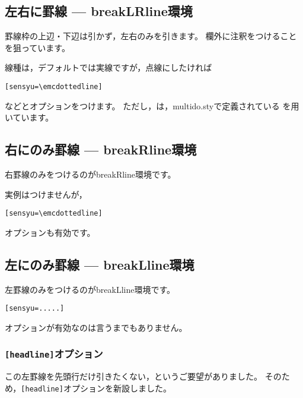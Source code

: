 \documentclass[a4j,fleqn]{jarticle}
\begin{document}
\subsection{左右に罫線 --- \textsf{breakLRline}環境}
罫線枠の上辺・下辺は引かず，左右のみを引きます。
欄外に注釈をつけることを狙っています。\bigskip



線種は，デフォルトでは実線ですが，点線にしたければ
\begin{jquote}
\begin{verbatim}
[sensyu=\emcdottedline]
\end{verbatim}
\end{jquote}
などとオプションをつけます。
ただし，は，\textsf{multido.sty}で定義されている
を用いています。



\subsection{右にのみ罫線 --- \textsf{breakRline}環境}
右罫線のみをつけるのが\textsf{breakRline}環境です。\bigskip



実例はつけませんが，
\begin{jquote}
\begin{verbatim}
[sensyu=\emcdottedline]
\end{verbatim}
\end{jquote}
オプションも有効です。

\subsection{左にのみ罫線 --- \textsf{breakLline}環境}
左罫線のみをつけるのが\textsf{breakLline}環境です。\bigskip



\begin{jquote}
\begin{verbatim}
[sensyu=.....]
\end{verbatim}
\end{jquote}
オプションが有効なのは言うまでもありません。



\subsubsection{\texttt{[headline]}オプション}
この左罫線を先頭行だけ引きたくない，というご要望がありました。
そのため，\verb+[headline]+オプションを新設しました。
\end{document}

